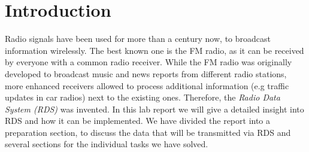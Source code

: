 \documentclass[sigconf]{acmart}
\begin{document}
%
%





\maketitle

\section{Introduction}

Radio signals have been used for more than a century now, to broadcast
information wirelessly. The best known one is the FM radio, as it can be
received by everyone with a common radio receiver. While the FM radio was
originally developed to broadcast music and news reports from different
radio stations, more enhanced receivers allowed to process additional
information (e.g traffic updates in car radios) next to the existing
ones. Therefore, the \emph{Radio Data System (RDS)} was invented. 
In this lab report we will give a detailed insight into RDS and how it can be
implemented. We have divided the report into a preparation section, to discuss the
data that will be transmitted via RDS and several sections for the individual tasks we have solved. 
\end{document}

